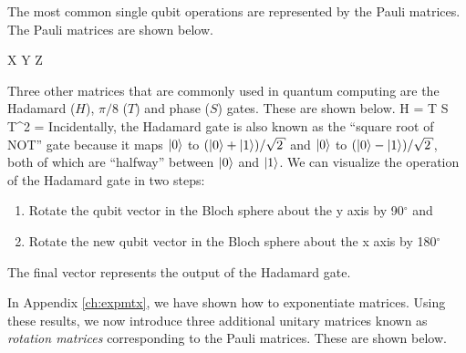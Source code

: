 The most common single qubit operations are represented by the Pauli matrices.  The Pauli matrices are shown below. 

\beq
X \equiv \left[\begin{array}{cc}0 & 1\\
1 & 0\end{array}\right] \text{ ; } Y \equiv \left[\begin{array}{cc}0 & -i\\
i & 0\end{array}\right] \text{ ; } Z \equiv \left[\begin{array}{cc}1 & 0\\
0 & -1\end{array}\right]
\eeq

Three other matrices that are commonly used in quantum computing are the Hadamard ($H$), $\pi/8$ ($T$) and phase ($S$) gates. These are shown below.
\beq
H \equiv {} = \left[\begin{array}{cc}1 & 1\\
1 & -1\end{array}\right] \text{ ; } T \equiv {} \text{ ; } S \equiv T^2 = \left[\begin{array}{cc}1 & 0\\
0 & i\end{array}\right]
\eeq
Incidentally, the Hadamard gate is also known as the ``square root of NOT'' gate because it maps $|0\rangle$ to $(\ket{0} + \ket{1})/\sqrt{2}$ and $|0\rangle$ to $(\ket{0} - \ket{1})/\sqrt{2}$, both of which are ``halfway'' between $|0\rangle$ and $|1\rangle$. We can visualize the operation of the Hadamard gate in two steps: 
\begin{enumerate}
\item Rotate the qubit vector in the Bloch sphere about the y axis by 90$^{\circ}$ and
\item Rotate the new qubit vector in the Bloch sphere about the x axis by 180$^{\circ}$
\end{enumerate}
The final vector represents the output of the Hadamard gate.

In Appendix \ref{ch:expmtx}, we have shown how to exponentiate matrices. Using these results, we now introduce three additional unitary matrices known as \textit{rotation matrices} corresponding to the Pauli matrices. These are shown below.

